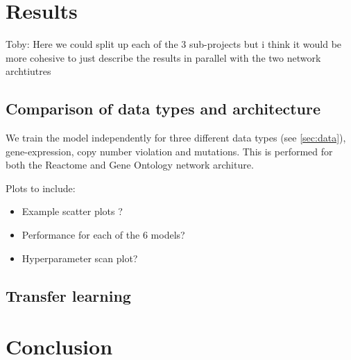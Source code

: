 \documentclass[NOTE, disdraft=true, UKenglish]{\DISCDTLATEXPATH UCLCDTDISdoc}
\begin{document}


\section{Results}
\label{sec:results}
{\color{red}Toby: Here we could split up each of the 3 sub-projects but i think it would be more cohesive to just describe the results in parallel with the two network archtiutres}
\\
\subsection{Comparison of data types and architecture}
We train the model independently for three different data types (see \ref{sec:data}), gene-expression, copy number violation and mutations. This is performed for both the Reactome and Gene Ontology network architure.
\\
{   \color{red}
Plots to include:
\begin{itemize}
    \item Example scatter plots ?
\item Performance for each of the 6 models?
\item Hyperparameter scan plot?
\end{itemize}}
\subsection{Transfer learning}
%

\section{Conclusion}
\label{sec:conclusion}


%
\end{document}
